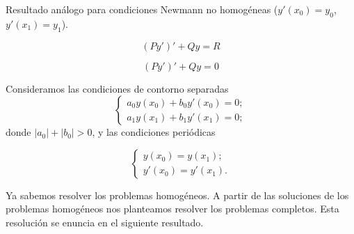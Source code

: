 \documentclass{article}
\begin{document}
\begin{ex}
  
\end{ex}

\begin{ex}
  Resultado análogo para condiciones Newmann no homogéneas ($y'(x_0) = y_0$, $y'(x_1) = y_1$).
\end{ex}

\begin{ex}
  
\end{ex}

\begin{equation}
  \label{eq:sturm:ec}
  (Py')' + Qy = R
\end{equation}

\begin{equation}
  \label{eq:sturm:eh}
  (Py')' + Qy = 0
\end{equation}

Consideramos las condiciones de contorno separadas
\begin{equation}
  \label{eq:sturm:sep}
  \begin{cases}
    a_0 y(x_0) + b_0 y'(x_0) = 0; \\ a_1 y(x_1) + b_1 y'(x_1) = 0;
  \end{cases}
\end{equation}
donde $|a_0| + |b_0| > 0$, y las condiciones periódicas

\begin{equation}
  \label{eq:sturm:ped}
  \begin{cases}
    y(x_0) = y(x_1); \\ y'(x_0) = y'(x_1).
  \end{cases}
\end{equation}

Ya sabemos resolver los problemas homogéneos. A partir de las soluciones de los problemas homogéneos
nos planteamos resolver los problemas completos. Esta resolución se enuncia en el siguiente
resultado.
\end{document}
